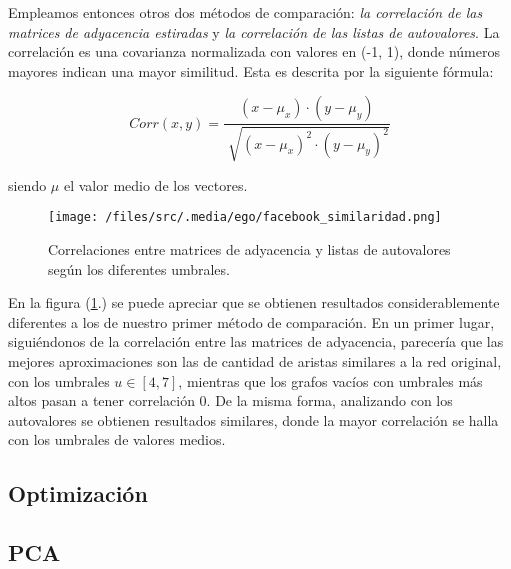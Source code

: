 \vspace{1em}

Empleamos entonces otros dos métodos de comparación: \textit{la correlación de las matrices de adyacencia estiradas} y \textit{la correlación de las listas de autovalores}. La correlación es una covarianza normalizada con valores en (-1, 1), donde números mayores indican una mayor similitud. Esta es descrita por la siguiente fórmula:

\begin{equation}
    Corr(x, y) = \frac{(x - \mu_{x}) \cdot (y - \mu_{y})}{\sqrt[]{(x - \mu_{x})^{2} \cdot (y - \mu_{y})^{2}}}
\end{equation}

siendo $\mu$ el valor medio de los vectores.

\vspace{1em}
\begin{figure}[!htbp]
\centering
\texttt{[image: /files/src/.media/ego/facebook\_similaridad.png]}
\caption{Correlaciones entre matrices de adyacencia y listas de autovalores según los diferentes umbrales.}
\label{grafo_correlaciones}
\end{figure}

En la figura (\ref{grafo_correlaciones}.) se puede apreciar que se obtienen resultados considerablemente diferentes a los de nuestro primer método de comparación. En un primer lugar, siguiéndonos de la correlación entre las matrices de adyacencia, parecería que las mejores aproximaciones son las de cantidad de aristas similares a la red original, con los umbrales $u \in [4,7]$, mientras que los grafos vacíos con umbrales más altos pasan a tener correlación 0. De la misma forma, analizando con los autovalores se obtienen resultados similares, donde la mayor correlación se halla con los umbrales de valores medios.  



\vspace{2em}
\subsection{Optimización}





\vspace{2em}
\subsection{PCA}
